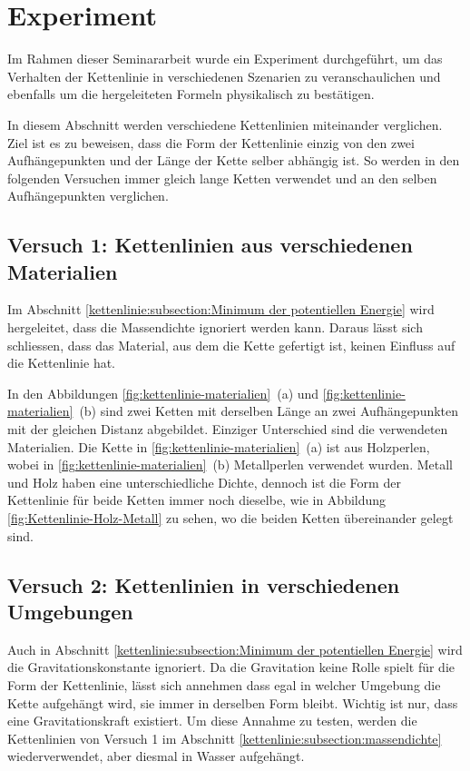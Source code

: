 %
%
%
%
\section{Experiment\label{kettenlinie:section:Experiment}}
Im Rahmen dieser Seminararbeit wurde ein Experiment durchgeführt, um das Verhalten der Kettenlinie in verschiedenen Szenarien zu veranschaulichen und ebenfalls um die hergeleiteten Formeln physikalisch zu bestätigen.

In diesem Abschnitt werden verschiedene Kettenlinien miteinander verglichen.
Ziel ist es zu beweisen, dass die Form der Kettenlinie einzig von den zwei Aufhängepunkten und der Länge der Kette selber abhängig ist.
So werden in den folgenden Versuchen immer gleich lange Ketten verwendet und an den selben Aufhängepunkten verglichen.

\subsection{Versuch 1: Kettenlinien aus verschiedenen Materialien
\label{kettenlinie:subsection:massendichte}}
%
%
Im Abschnitt \ref{kettenlinie:subsection:Minimum der potentiellen Energie} wird hergeleitet, dass die Massendichte ignoriert werden kann. Daraus lässt sich schliessen, dass das Material, aus dem die Kette gefertigt ist, keinen Einfluss auf die Kettenlinie hat.

In den Abbildungen \ref{fig:kettenlinie-materialien}~(a) und
\ref{fig:kettenlinie-materialien}~(b) sind zwei Ketten mit derselben
Länge an zwei Aufhängepunkten mit der gleichen Distanz abgebildet.
Einziger Unterschied sind die verwendeten Materialien.
Die Kette in \ref{fig:kettenlinie-materialien}~(a) ist aus Holzperlen,
wobei in \ref{fig:kettenlinie-materialien}~(b) Metallperlen verwendet
wurden.
Metall und Holz haben eine unterschiedliche Dichte, dennoch ist die
Form der Kettenlinie für beide Ketten immer noch dieselbe, wie in
Abbildung \ref{fig:Kettenlinie-Holz-Metall} zu sehen, wo die beiden
Ketten übereinander gelegt sind.
%
%


\subsection{Versuch 2: Kettenlinien in verschiedenen Umgebungen
\label{kettenlinie:subsection:umgebung}}
%
%
Auch in Abschnitt \ref{kettenlinie:subsection:Minimum der potentiellen Energie} wird die Gravitationskonstante ignoriert.
Da die Gravitation keine Rolle spielt für die Form der Kettenlinie, lässt sich annehmen dass egal in welcher Umgebung die Kette aufgehängt wird, sie immer in derselben Form bleibt.
Wichtig ist nur, dass eine Gravitationskraft existiert.
Um diese Annahme zu testen, werden die Kettenlinien von Versuch 1 im Abschnitt \ref{kettenlinie:subsection:massendichte} wiederverwendet, aber diesmal in Wasser aufgehängt.

